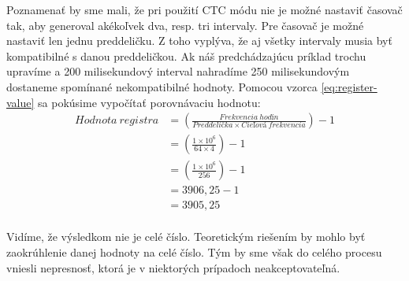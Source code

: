 Poznamenať by sme mali, že pri použití CTC módu nie je možné nastaviť časovač tak, aby generoval akékoľvek dva, resp. tri intervaly. Pre časovač je možné nastaviť
len jednu preddeličku. Z toho vyplýva, že aj všetky intervaly musia byť kompatibilné s danou preddeličkou. Ak náš predchádzajúcu príklad trochu upravíme
a 200 milisekundový interval nahradíme 250 milisekundovým dostaneme spomínané nekompatibilné hodnoty. Pomocou vzorca \ref{eq:register-value} sa pokúsime vypočítať
porovnávaciu hodnotu:
\begin{equation}
    \begin{aligned}
        Hodnota\:registra & = (\frac{Frekvencia\:hodín}{Preddelička \times Cieľová\:frekvencia}) - 1 \\
                          & = (\frac{1 \times 10^{6}}{64 \times 4}) - 1                              \\
                          & = (\frac{1 \times 10^{6}}{256}) - 1                                      \\
                          & = 3906,25 - 1                                                            \\
                          & = 3905,25                                                                \\
    \end{aligned}
\end{equation}

Vidíme, že výsledkom nie je celé číslo. Teoretickým riešením by mohlo byť zaokrúhlenie danej hodnoty na celé číslo. Tým by sme však do celého procesu vniesli nepresnosť,
ktorá je v niektorých prípadoch neakceptovateľná.

